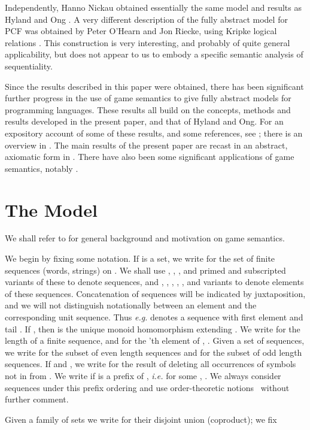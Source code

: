 \documentclass[11pt]{article}
\newcommand{\even}[1]{\mbox{}}
\newcommand{\odd}[1]{\mbox{}}
\begin{document}
Independently, Hanno Nickau obtained essentially the same model and results
as Hyland and Ong \cite{NickauH:hersf}. A very different description
of the fully abstract 
model for PCF was obtained by Peter O'Hearn and Jon Riecke, using Kripke logical
relations \cite{OHearnPW:krilrp}. This construction is very
interesting, and probably 
of quite general applicability, but does not appear to us to embody a
specific semantic analysis of sequentiality.

Since the results described in this paper were obtained, there has
been significant further progress in the use of game semantics to give
fully abstract models for programming languages. 
These results all build on the concepts, methods and results developed
in the present paper, and that of Hyland and Ong. For an expository account of 
some of these results, and some references,
see \cite{AM97}; there is an overview in \cite{Abr97}.
The main results of the present paper are recast in an abstract,
axiomatic form in \cite{Abr00}.
There have also been some
significant applications of game semantics, notably \cite{MH99,GM00}.


\section{The Model}
We shall refer to
\cite{AbramskyS:gamfcm} for general background and motivation on game semantics.

We begin by fixing some notation.  If  is a set, we write
 for the set of finite sequences (words, strings) on .
We shall use , , ,   and primed and subscripted variants
of these to denote sequences, and , , , , ,  and
variants to denote
elements of these sequences. Concatenation of sequences will be indicated
by juxtaposition, and we will not distinguish notationally between an element
and the corresponding unit sequence. Thus {\sl e.g.}  denotes a sequence
with first element   and tail .
If , then  is
the unique monoid homomorphism extending .  We write  for the
length of a finite sequence, and  for the 'th element of ,
.
Given a set  of sequences, we write
\even{S} for the subset of even length sequences and \odd{S} for the
subset of odd length sequences.  If  and , we write  for the result of
deleting all occurrences of symbols not in  from .
We write  if  is a prefix of , {\em i.e.} for some , .  We always consider sequences under this prefix ordering and use
order-theoretic notions~\cite{DaveyBA:Intlor} without further comment.

Given a family of sets  we write 
for their disjoint union (coproduct); we fix
\end{document}
